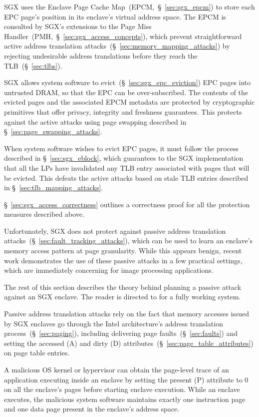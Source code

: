 SGX uses the Enclave Page Cache Map~(EPCM,~\S~\ref{sec:sgx_epcm}) to store each
EPC page's position in its enclave's virtual address space. The EPCM is
consulted by SGX's extensions to the Page Miss
Handler~(PMH,~\S~\ref{sec:sgx_access_concepts}), which prevent straightforward
active address translation attacks~(\S~\ref{sec:memory_mapping_attacks}) by
rejecting undesirable address translations before they reach the
TLB~(\S~\ref{sec:tlbs}).

SGX allows system software to evict~(\S~\ref{sec:sgx_epc_eviction}) EPC pages
into untrusted DRAM, so that the EPC can be over-subscribed. The contents of
the evicted pages and the associated EPCM metadata are protected by
cryptographic primitives that offer privacy, integrity and freshness
guarantees. This protects against the active attacks using page swapping
described in \S~\ref{sec:page_swapping_attacks}.

When system software wishes to evict EPC pages, it must follow the process
described in \S~\ref{sec:sgx_eblock}, which guarantees to the SGX
implementation that all the LPs have invalidated any TLB entry associated with
pages that will be evicted. This defeats the active attacks based on stale TLB
entries described in \S~\ref{sec:tlb_mapping_attacks}.

\S~\ref{sec:sgx_access_correctness} outlines a correctness proof for all the
protection measures described above.

Unfortunately, SGX does not protect against passive address translation
attacks~(\S~\ref{sec:fault_tracking_attacks}), which can be used to learn an
enclave's memory access pattern at page granularity. While this appears
benign, recent work \cite{xu2015pagefaults} demonstrates the use of these
passive attacks in a few practical settings, which are immediately concerning
for image processing applications.

The rest of this section describes the theory behind planning a passive attack
against an SGX enclave. The reader is directed to \cite{xu2015pagefaults} for
a fully working system.

Passive address translation attacks rely on the fact that memory accesses
issued by SGX enclaves go through the Intel architecture's address translation
process~(\S~\ref{sec:paging}), including delivering page
faults~(\S~\ref{sec:faults}) and setting the accessed (A) and dirty (D)
attributes~(\S~\ref{sec:page_table_attributes}) on page table entries.

A malicious OS kernel or hypervisor can obtain the page-level trace of an
application executing inside an enclave by setting the present (P) attribute to
0 on all the enclave's pages before starting enclave execution. While an
enclave executes, the malicious system software maintains exactly one
instruction page and one data page present in the enclave's address space.

